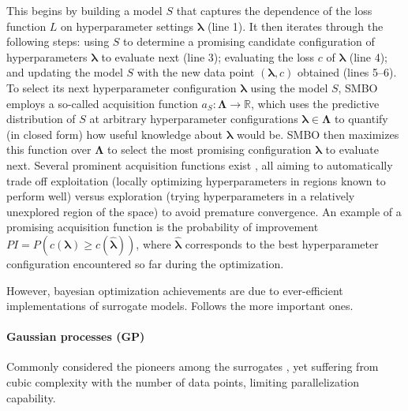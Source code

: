 \noindent This begins by building a model $S$ that captures the dependence of the loss function $L$ on hyperparameter settings $\pmb{\lambda}$ (line 1).
It then iterates through the following steps: using $S$ to determine a promising candidate configuration of hyperparameters $\pmb{\lambda}$ to evaluate next (line 3); evaluating the loss $c$ of $\pmb{\lambda}$ (line 4); and updating the model $S$ with the new data point $(\pmb{\lambda}, c)$ obtained (lines 5–6).
To select its next hyperparameter configuration $\pmb{\lambda}$ using the model $S$, SMBO employs a so-called acquisition function $a_{S} : \pmb{\Lambda} \rightarrow \mathbb{R}$, which uses the predictive distribution of $S$ at arbitrary hyperparameter configurations $\pmb{\lambda} \in \pmb{\Lambda}$ to quantify (in closed form) how useful knowledge about $\pmb{\lambda}$ would be.
SMBO then maximizes this function over $\pmb{\Lambda}$ to select the most promising configuration $\pmb{\lambda}$ to evaluate next.
Several prominent acquisition functions exist \cite{bohannon2005cost, chen2018autostacker, de2018automated}, all aiming to automatically trade off exploitation (locally optimizing hyperparameters in regions known to perform well) versus exploration (trying hyperparameters in a relatively unexplored region of the space) to avoid premature convergence.
An example of a promising acquisition function is the probability of improvement $PI = P(c(\pmb{\lambda}) \ge c(\hat{\pmb{\lambda}}))$, where $\hat{\pmb{\lambda}}$ corresponds to the best hyperparameter configuration encountered so far during the optimization.

However, bayesian optimization achievements are due to ever-efficient implementations of surrogate models.
Follows the more important ones.

\paragraph{Gaussian processes (GP)} Commonly considered the pioneers among the surrogates \cite{snoek2012practical, martinez2014bayesopt}, yet suffering from cubic complexity with the number of data points, limiting parallelization capability.

